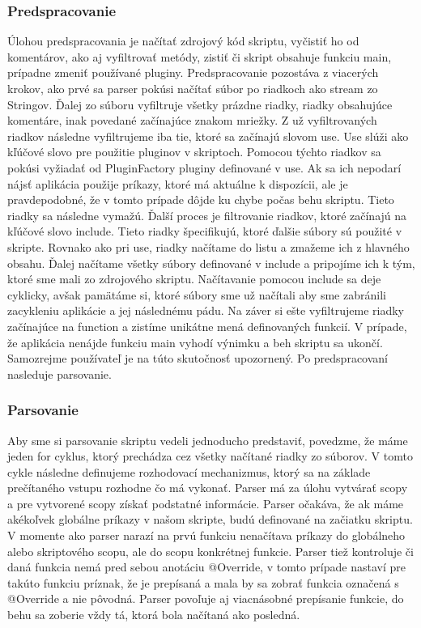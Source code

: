 \subsubsection{Predspracovanie}
\indent Úlohou predspracovania je načítať zdrojový kód skriptu, vyčistiť ho od komentárov, ako aj vyfiltrovať metódy, zistiť či skript obsahuje funkciu main, prípadne zmeniť používané pluginy. Predspracovanie pozostáva z viacerých krokov, ako prvé sa parser pokúsi načítať súbor po riadkoch ako stream zo Stringov. Ďalej zo súboru vyfiltruje všetky prázdne riadky, riadky obsahujúce komentáre, inak povedané začínajúce znakom mriežky. Z už vyfiltrovaných riadkov následne vyfiltrujeme iba tie, ktoré sa začínajú slovom use. Use slúži ako kľúčové slovo pre použitie pluginov v skriptoch. Pomocou týchto riadkov sa pokúsi vyžiadať od PluginFactory pluginy definované v use. Ak sa ich nepodarí nájsť aplikácia použije príkazy, ktoré má aktuálne k dispozícii, ale je pravdepodobné, že v tomto prípade dôjde ku chybe počas behu skriptu. Tieto riadky sa následne vymažú. Ďalší proces je filtrovanie riadkov, ktoré začínajú na kľúčové slovo include. Tieto riadky špecifikujú, ktoré ďalšie súbory sú použité v skripte. Rovnako ako pri use, riadky načítame do listu a zmažeme ich z hlavného obsahu. Ďalej načítame všetky súbory definované v include a pripojíme ich k tým, ktoré sme mali zo zdrojového skriptu. Načítavanie pomocou include sa deje cyklicky, avšak pamätáme si, ktoré súbory sme už načítali aby sme zabránili zacykleniu aplikácie a jej následnému pádu. Na záver si ešte vyfiltrujeme riadky začínajúce na function a zistíme unikátne mená definovaných funkcií. V prípade, že aplikácia nenájde funkciu main vyhodí výnimku a beh skriptu sa ukončí. Samozrejme používateľ je na túto skutočnosť upozornený. Po predspracovaní nasleduje parsovanie.
\subsubsection{Parsovanie}
\indent Aby sme si parsovanie skriptu vedeli jednoducho predstaviť, povedzme, že máme jeden for cyklus, ktorý prechádza cez všetky načítané riadky zo súborov. V tomto cykle následne definujeme rozhodovací mechanizmus, ktorý sa na základe prečítaného vstupu rozhodne čo má vykonať. Parser má za úlohu vytvárať scopy a pre vytvorené scopy získať podstatné informácie. Parser očakáva, že ak máme akékoľvek globálne príkazy v našom skripte, budú definované na začiatku skriptu. V momente ako parser narazí na prvú funkciu nenačítava príkazy do globálneho alebo skriptového scopu, ale do scopu konkrétnej funkcie. Parser tiež kontroluje či daná funkcia nemá pred sebou anotáciu @Override, v tomto prípade nastaví pre takúto funkciu príznak, že je prepísaná a mala by sa zobrať funkcia označená s @Override a nie pôvodná. Parser povoľuje aj viacnásobné prepísanie funkcie, do behu sa zoberie vždy tá, ktorá bola načítaná ako posledná. 
